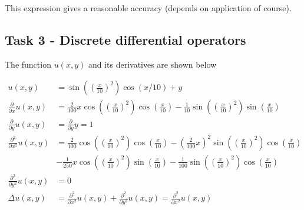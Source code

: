 \documentclass[paper=a4, fontsize=12pt]{article} %
\begin{document}
This expression gives a reasonable accuracy (depends on application of course).






% 
%
%
%
%
%

\subsection*{Task 3 - Discrete differential operators}

The function $u(x,y)$ and its derivatives are shown below

\begin{align*}
u(x,y) &= \sin\left(\left(\frac{x}{10}\right) ^2\right ) \cos(x/10)+y \\
\frac{\partial}{\partial x} u(x,y) &= \frac{2}{100}x\cos\left(\left(\frac{x}{10}\right) ^2\right )\cos\left(\frac{x}{10}\right )- \frac{1}{10}\sin\left(\left(\frac{x}{10}\right) ^2\right )\sin\left (\frac{x}{10}\right )\\
\frac{\partial}{\partial y} u(x,y) &= \frac{\partial}{\partial y}y = 1   \\
\frac{\partial^2}{\partial x^2} u(x,y) &= \frac{2}{100}\cos\left(\left(\frac{x}{10}\right) ^2\right )\cos\left(\frac{x}{10}\right ) - \left ( \frac{2}{100}x\right )^2 \sin \left(\left(\frac{x}{10}\right) ^2\right )\cos\left(\frac{x}{10}\right ) \\
 &- \frac{1}{250}x\cos\left(\left(\frac{x}{10}\right) ^2\right )\sin\left(\frac{x}{10}\right ) - \frac{1}{100}\sin\left(\left(\frac{x}{10}\right) ^2\right )\cos\left (\frac{x}{10}\right )\\
\frac{\partial^2}{\partial y^2} u(x,y) &= 0 \\
\Delta u(x,y) &= \frac{\partial^2}{\partial x^2} u(x,y) + \frac{\partial^2}{\partial y^2} u(x,y) =  \frac{\partial^2}{\partial x^2} u(x,y)
\end{align*}
\end{document}
